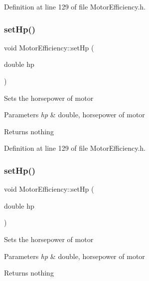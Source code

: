 Definition at line 129 of file Motor\+Efficiency.\+h.

\mbox{\label{class_motor_efficiency_a4b86113447665413ddbae115199d9b3f}} 
\subsubsection{\texorpdfstring{set\+Hp()}{setHp()}\hspace{0.1cm}{\footnotesize\ttfamily [2/3]}}
{\footnotesize\ttfamily void Motor\+Efficiency\+::set\+Hp (\begin{DoxyParamCaption}\item[{double}]{hp }\end{DoxyParamCaption})\hspace{0.3cm}{\ttfamily [inline]}}

Sets the horsepower of motor


\begin{DoxyParams}{Parameters}
{\em hp} & double, horsepower of motor\\
\hline
\end{DoxyParams}
\begin{DoxyReturn}{Returns}
nothing 
\end{DoxyReturn}


Definition at line 129 of file Motor\+Efficiency.\+h.

\mbox{\label{class_motor_efficiency_a4b86113447665413ddbae115199d9b3f}} 
\subsubsection{\texorpdfstring{set\+Hp()}{setHp()}\hspace{0.1cm}{\footnotesize\ttfamily [3/3]}}
{\footnotesize\ttfamily void Motor\+Efficiency\+::set\+Hp (\begin{DoxyParamCaption}\item[{double}]{hp }\end{DoxyParamCaption})\hspace{0.3cm}{\ttfamily [inline]}}

Sets the horsepower of motor


\begin{DoxyParams}{Parameters}
{\em hp} & double, horsepower of motor\\
\hline
\end{DoxyParams}
\begin{DoxyReturn}{Returns}
nothing 
\end{DoxyReturn}


